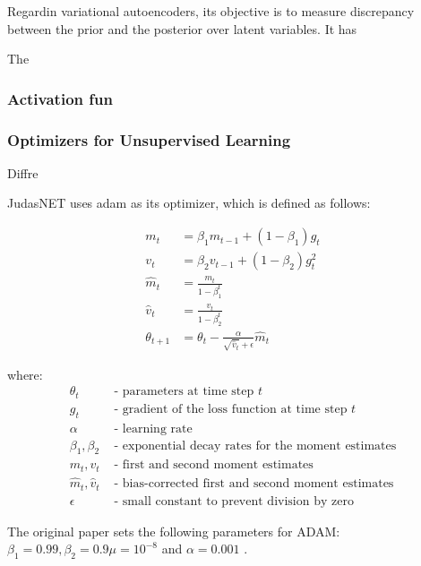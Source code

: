 Regardin variational autoencoders, its objective is to measure discrepancy between the prior and the posterior over latent variables. It has 

The 

\subsubsection{Activation fun}


\subsubsection{Optimizers for Unsupervised Learning }

Diffre



JudasNET uses \Gls{adam} as its optimizer, which is defined as follows: 


\begin{align}
    m_t &= \beta_1 m_{t-1} + (1 - \beta_1) g_t \\
    v_t &= \beta_2 v_{t-1} + (1 - \beta_2) g_t^2 \\
    \hat{m}_t &= \frac{m_t}{1 - \beta_1^t} \\
    \hat{v}_t &= \frac{v_t}{1 - \beta_2^t} \\
    \theta_{t+1} &= \theta_t - \frac{\alpha}{\sqrt{\hat{v}_t} + \epsilon} \hat{m}_t
\end{align}

where:
\begin{align*}
    \theta_t & \text{ - parameters at time step } t \\
    g_t & \text{ - gradient of the loss function at time step } t \\
    \alpha & \text{ - learning rate} \\
    \beta_1, \beta_2 & \text{ - exponential decay rates for the moment estimates} \\
    m_t, v_t & \text{ - first and second moment estimates} \\
    \hat{m}_t, \hat{v}_t & \text{ - bias-corrected first and second moment estimates} \\
    \epsilon & \text{ - small constant to prevent division by zero}
\end{align*}

The original paper sets the following parameters for ADAM: $\beta_1 = 0.99, \beta_2 = 0.9 \mu=10^{-8}$ and $\alpha = 0.001$ \cite{kingma2017adam}.